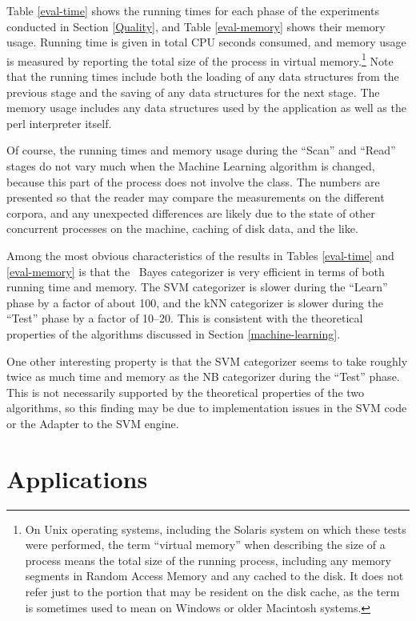 Table \ref{eval-time} shows the running times for each phase of the
experiments conducted in Section \ref{Quality}, and Table
\ref{eval-memory} shows their memory usage.
Running time is given in total CPU seconds consumed,
and memory usage is measured by reporting the total size of the
process in virtual memory.\footnote{On Unix operating systems,
  including the Solaris system on which these tests were performed,
  the term ``virtual memory'' when describing the size of a process
  means the total size of the running process, including any memory
  segments in Random Access Memory and any cached to the disk.  It
  does not refer just to the portion that may be resident on the disk
  cache, as the term is sometimes used to mean on Windows or older
  Macintosh systems.}
Note that the running times include both
the loading of any data structures from the previous stage and the
saving of any data structures for the next stage.  The memory usage
includes any data structures used by the application as well as the
perl interpreter itself.

Of course, the running times and memory usage during the ``Scan'' and
``Read'' stages do not vary much when the Machine Learning algorithm
is changed, because this part of the process does not involve the
 class.  The numbers are presented so that the reader
may compare the measurements on the different corpora, and any
unexpected differences are likely due to the state of other concurrent
processes on the machine, caching of disk data, and the like.

Among the most obvious characteristics of the results in Tables
\ref{eval-time} and \ref{eval-memory} is that the \naive\ Bayes
categorizer is very efficient in terms of both running time and
memory.  The SVM categorizer is slower during the ``Learn'' phase by a
factor of about 100, and the kNN categorizer is slower during the
``Test'' phase by a factor of 10--20.  This is consistent with the
theoretical properties of the algorithms discussed in Section
\ref{machine-learning}.

One other interesting property is that the SVM categorizer seems to
take roughly twice as much time and memory as the NB categorizer
during the ``Test'' phase.  This is not necessarily supported by the
theoretical properties of the two algorithms, so this finding may be
due to implementation issues in the SVM code or the Adapter to the SVM
engine.


\section{Applications}
\label{Applications}

